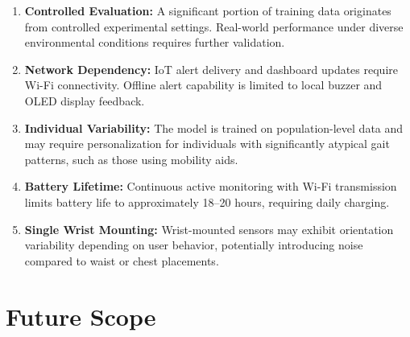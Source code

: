 \documentclass[conference]{IEEEtran}
\begin{document}
\begin{enumerate}
  \item \textbf{Controlled Evaluation:} A significant portion of training data originates from controlled experimental settings. Real-world performance under diverse environmental conditions requires further validation.
  \item \textbf{Network Dependency:} IoT alert delivery and dashboard updates require Wi-Fi connectivity. Offline alert capability is limited to local buzzer and OLED display feedback.
  \item \textbf{Individual Variability:} The model is trained on population-level data and may require personalization for individuals with significantly atypical gait patterns, such as those using mobility aids.
  \item \textbf{Battery Lifetime:} Continuous active monitoring with Wi-Fi transmission limits battery life to approximately 18--20 hours, requiring daily charging.
  \item \textbf{Single Wrist Mounting:} Wrist-mounted sensors may exhibit orientation variability depending on user behavior, potentially introducing noise compared to waist or chest placements.
\end{enumerate}

\section{Future Scope}
\end{document}
